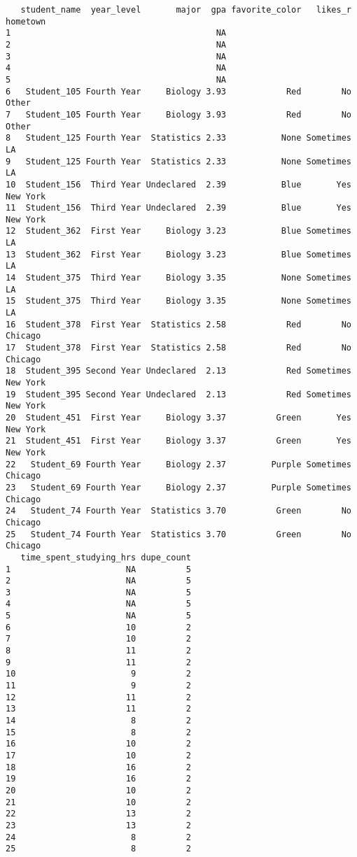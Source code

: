 \documentclass[
  letterpaper,
  DIV=11,
  numbers=noendperiod]{scrartcl}
\begin{document}
\begin{verbatim}
   student_name  year_level       major  gpa favorite_color   likes_r hometown
1                                         NA                                  
2                                         NA                                  
3                                         NA                                  
4                                         NA                                  
5                                         NA                                  
6   Student_105 Fourth Year     Biology 3.93            Red        No    Other
7   Student_105 Fourth Year     Biology 3.93            Red        No    Other
8   Student_125 Fourth Year  Statistics 2.33           None Sometimes       LA
9   Student_125 Fourth Year  Statistics 2.33           None Sometimes       LA
10  Student_156  Third Year Undeclared  2.39           Blue       Yes New York
11  Student_156  Third Year Undeclared  2.39           Blue       Yes New York
12  Student_362  First Year     Biology 3.23           Blue Sometimes       LA
13  Student_362  First Year     Biology 3.23           Blue Sometimes       LA
14  Student_375  Third Year     Biology 3.35           None Sometimes       LA
15  Student_375  Third Year     Biology 3.35           None Sometimes       LA
16  Student_378  First Year  Statistics 2.58            Red        No  Chicago
17  Student_378  First Year  Statistics 2.58            Red        No  Chicago
18  Student_395 Second Year Undeclared  2.13            Red Sometimes New York
19  Student_395 Second Year Undeclared  2.13            Red Sometimes New York
20  Student_451  First Year     Biology 3.37          Green       Yes New York
21  Student_451  First Year     Biology 3.37          Green       Yes New York
22   Student_69 Fourth Year     Biology 2.37         Purple Sometimes  Chicago
23   Student_69 Fourth Year     Biology 2.37         Purple Sometimes  Chicago
24   Student_74 Fourth Year  Statistics 3.70          Green        No  Chicago
25   Student_74 Fourth Year  Statistics 3.70          Green        No  Chicago
   time_spent_studying_hrs dupe_count
1                       NA          5
2                       NA          5
3                       NA          5
4                       NA          5
5                       NA          5
6                       10          2
7                       10          2
8                       11          2
9                       11          2
10                       9          2
11                       9          2
12                      11          2
13                      11          2
14                       8          2
15                       8          2
16                      10          2
17                      10          2
18                      16          2
19                      16          2
20                      10          2
21                      10          2
22                      13          2
23                      13          2
24                       8          2
25                       8          2
\end{verbatim}
\end{document}
